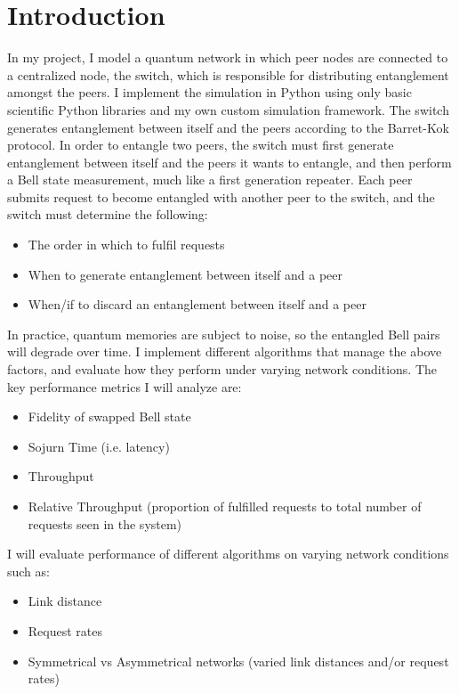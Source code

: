 \section{Introduction}
In my project, I model a quantum network in which peer nodes are connected to a centralized node, the switch, which is responsible for distributing entanglement amongst the peers.
I implement the simulation in Python using only basic scientific Python libraries and my own custom simulation framework.
The switch generates entanglement between itself and the peers according to the Barret-Kok protocol.
In order to entangle two peers, the switch must first generate entanglement between itself and the peers it wants to entangle, and then perform a Bell state measurement, much like a first generation repeater.
Each peer submits request to become entangled with another peer to the switch, and the switch must determine the following:

\begin{itemize}
    \item The order in which to fulfil requests
    \item When to generate entanglement between itself and a peer
    \item When/if to discard an entanglement between itself and a peer
\end{itemize}

In practice, quantum memories are subject to noise, so the entangled Bell pairs will degrade over time.
I implement different algorithms that manage the above factors, and evaluate how they perform under varying network conditions.
The key performance metrics I will analyze are:
\begin{itemize}
    \item Fidelity of swapped Bell state
    \item Sojurn Time (i.e. latency)
    \item Throughput
    \item Relative Throughput (proportion of fulfilled requests to total number of requests seen in the system)
\end{itemize}
I will evaluate performance of different algorithms on varying network conditions such as:
\begin{itemize}
    \item Link distance
    \item Request rates
    \item Symmetrical vs Asymmetrical networks (varied link distances and/or request rates)
\end{itemize}